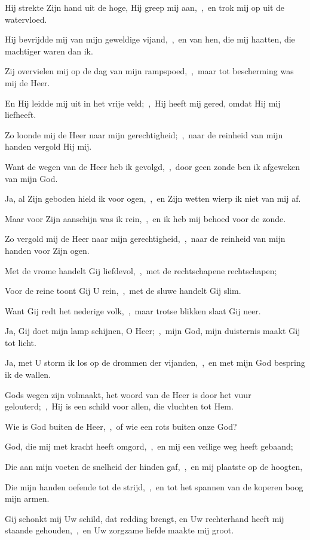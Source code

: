 \documentclass[12pt,twoside,a5paper]{article}
\begin{document}
\begin{halfparskip}
  Hij strekte Zijn hand uit de hoge, Hij greep mij aan,~\sep\ en trok mij op uit de watervloed.

  Hij bevrijdde mij van mijn geweldige vijand,~\sep\ en van hen, die mij haatten, die machtiger waren dan ik.

  Zij overvielen mij op de dag van mijn rampspoed,~\sep\ maar tot bescherming was mij de Heer.

  En Hij leidde mij uit in het vrije veld;~\sep\ Hij heeft mij gered, omdat Hij mij liefheeft.

  Zo loonde mij de Heer naar mijn gerechtigheid;~\sep\ naar de reinheid van mijn handen vergold Hij mij.

  Want de wegen van de Heer heb ik gevolgd,~\sep\ door geen zonde ben ik afgeweken van mijn God.

  Ja, al Zijn geboden hield ik voor ogen,~\sep\ en Zijn wetten wierp ik niet van mij af.

  Maar voor Zijn aanschijn was ik rein,~\sep\ en ik heb mij behoed voor de zonde.

  Zo vergold mij de Heer naar mijn gerechtigheid,~\sep\ naar de reinheid van mijn handen voor Zijn ogen.

  Met de vrome handelt Gij liefdevol,~\sep\ met de rechtschapene rechtschapen;

  Voor de reine toont Gij U rein,~\sep\ met de sluwe handelt Gij slim.

  Want Gij redt het nederige volk,~\sep\ maar trotse blikken slaat Gij neer.

  Ja, Gij doet mijn lamp schijnen, O Heer;~\sep\ mijn God, mijn duisternis maakt Gij tot licht.

  Ja, met U storm ik los op de drommen der vijanden,~\sep\ en met mijn God bespring ik de wallen.

  Gods wegen zijn volmaakt, het woord van de Heer is door het vuur gelouterd;~\sep\ Hij is een schild voor allen, die vluchten tot Hem.

  Wie is God buiten de Heer,~\sep\ of wie een rots buiten onze God?

  God, die mij met kracht heeft omgord,~\sep\ en mij een veilige weg heeft gebaand;

  Die aan mijn voeten de snelheid der hinden gaf,~\sep\ en mij plaatste op de hoogten,

  Die mijn handen oefende tot de strijd,~\sep\ en tot het spannen van de koperen boog mijn armen.

  Gij schonkt mij Uw schild, dat redding brengt, en Uw rechterhand heeft mij staande gehouden,~\sep\ en Uw zorgzame liefde maakte mij groot.


\end{halfparskip}
\end{document}
